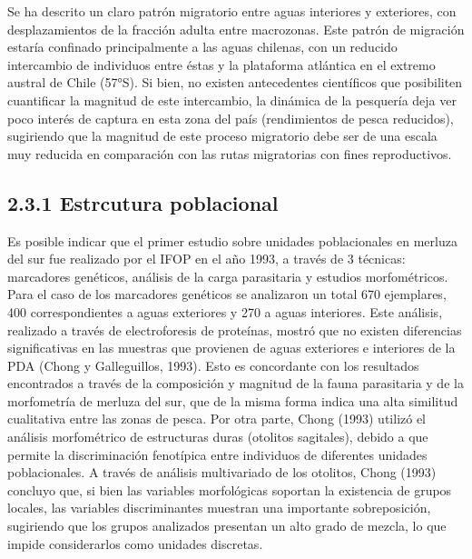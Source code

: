 \documentclass[
  spanish,
]{article}
\begin{document}
Se ha descrito un claro patrón migratorio entre aguas interiores y
exteriores, con desplazamientos de la fracción adulta entre macrozonas.
Este patrón de migración estaría confinado principalmente a las aguas
chilenas, con un reducido intercambio de individuos entre éstas y la
plataforma atlántica en el extremo austral de Chile (57°S). Si bien, no
existen antecedentes científicos que posibiliten cuantificar la magnitud
de este intercambio, la dinámica de la pesquería deja ver poco interés
de captura en esta zona del país (rendimientos de pesca reducidos),
sugiriendo que la magnitud de este proceso migratorio debe ser de una
escala muy reducida en comparación con las rutas migratorias con fines
reproductivos.

\hypertarget{estrcutura-poblacional}{%
\subsection{2.3.1 Estrcutura poblacional}\label{estrcutura-poblacional}}

Es posible indicar que el primer estudio sobre unidades poblacionales en
merluza del sur fue realizado por el IFOP en el año 1993, a través de 3
técnicas: marcadores genéticos, análisis de la carga parasitaria y
estudios morfométricos. Para el caso de los marcadores genéticos se
analizaron un total 670 ejemplares, 400 correspondientes a aguas
exteriores y 270 a aguas interiores. Este análisis, realizado a través
de electroforesis de proteínas, mostró que no existen diferencias
significativas en las muestras que provienen de aguas exteriores e
interiores de la PDA (Chong y Galleguillos, 1993). Esto es concordante
con los resultados encontrados a través de la composición y magnitud de
la fauna parasitaria y de la morfometría de merluza del sur, que de la
misma forma indica una alta similitud cualitativa entre las zonas de
pesca. Por otra parte, Chong (1993) utilizó el análisis morfométrico de
estructuras duras (otolitos sagitales), debido a que permite la
discriminación fenotípica entre individuos de diferentes unidades
poblacionales. A través de análisis multivariado de los otolitos, Chong
(1993) concluyo que, si bien las variables morfológicas soportan la
existencia de grupos locales, las variables discriminantes muestran una
importante sobreposición, sugiriendo que los grupos analizados presentan
un alto grado de mezcla, lo que impide considerarlos como unidades
discretas.
\end{document}
